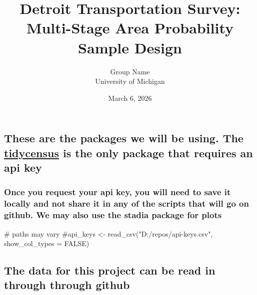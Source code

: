 \documentclass[
  12pt]{article}
\newenvironment{Shaded}{\begin{snugshade}}{\end{snugshade}}
\newcommand{\CommentTok}[1]{\textcolor[rgb]{0.37,0.37,0.37}{#1}}
\begin{document}
\def\spacingset#1{\renewcommand{\baselinestretch}%
{#1}\small\normalsize} \spacingset{1}



\date{March 6, 2026}
\title{\bf Detroit Transportation Survey: Multi-Stage Area Probability
Sample Design}
\author{
Group Name\\
University of Michigan\\
}
\maketitle

\bigskip
\bigskip
\begin{abstract}

\end{abstract}


\newpage
\spacingset{1.9} %


\subsection{\texorpdfstring{These are the packages we will be using. The
\href{https://walker-data.com/tidycensus/}{tidycensus} is the only
package that requires an api
key}{These are the packages we will be using. The tidycensus is the only package that requires an api key}}\label{these-are-the-packages-we-will-be-using.-the-tidycensus-is-the-only-package-that-requires-an-api-key}

\subsubsection{Once you request your api key, you will need to save it
locally and not share it in any of the scripts that will go on github.
We may also use the stadia package for
plots}\label{once-you-request-your-api-key-you-will-need-to-save-it-locally-and-not-share-it-in-any-of-the-scripts-that-will-go-on-github.-we-may-also-use-the-stadia-package-for-plots}

\begin{Shaded}
\begin{Highlighting}[]
\CommentTok{\# paths may vary}
\CommentTok{\#api\_keys \textless{}{-} read\_csv("D:/repos/api{-}keys.csv", show\_col\_types = FALSE)}
\end{Highlighting}
\end{Shaded}

\subsection{The data for this project can be read in through through
github}\label{the-data-for-this-project-can-be-read-in-through-through-github}
\end{document}
